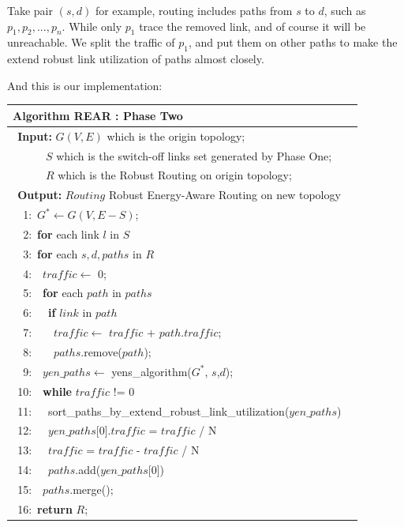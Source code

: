 \documentclass[conference]{IEEEtran}
\begin{document}
Take pair $(s, d)$ for example, routing includes paths from $s$ to $d$, such as $p_1, p_2, ... , p_n$. While only $p_1$ trace 
the removed link, and of course it will be unreachable. We split the traffic of $p_1$, and put them on other paths to make 
the extend robust link utilization of paths almost closely.


And this is our implementation:
\begin{table}[!th]
\begin{tabular}{ll}
\hline
\textbf{Algorithm REAR : Phase Two}\\
\hline
$\:\:$\textbf{Input:} $G(V,E)$ which is the origin topology;\\
$\quad\quad\ \ \ $ $S$ which is the switch-off links set generated by Phase One;\\
$\quad\quad\ \ \ $ $R$ which is the Robust Routing on origin topology;\\
$\:\:$\textbf{Output:} $Routing$ Robust Energy-Aware Routing on new topology\\
$\:\:$\ 1:\ $G^* \leftarrow G(V, E-S)$;\\
$\:\:$\ 2:\ \textbf{for} {each link $l$ in $S$}\\
$\:\:$\ 3:\quad\ \textbf{for} {each $s,d,paths$ in $R$}\\
$\:\:$\ 4:\quad\ \quad\ $traffic \leftarrow$ 0;\\
$\:\:$\ 5:\quad\ \quad\ \textbf{for} {each $path$ in $paths$}\\
$\:\:$\ 6:\quad\ \quad\ \quad\ \textbf{if} {$link$ in $path$}\\
$\:\:$\ 7:\quad\ \quad\ \quad\ \quad\ $traffic \leftarrow$ $traffic$ + $path$.$traffic$; \\
$\:\:$\ 8:\quad\ \quad\ \quad\ \quad\ $paths$.remove($path$); \\
$\:\:$\ 9:\quad\ \quad\ $yen\_paths \leftarrow$ yens\_algorithm($G^*$, $s$,$d$);\\
$\:\:$10:\quad\ \quad\ \textbf{while} {$traffic$ != 0}\\
$\:\:$11:\quad\ \quad\ \quad\ sort\_paths\_by\_extend\_robust\_link\_utilization($yen\_paths$)\\
$\:\:$12:\quad\ \quad\ \quad\ $yen\_paths$[0].$traffic$ = $traffic$ / N\\
$\:\:$13:\quad\ \quad\ \quad\ $traffic$ = $traffic$ - $traffic$ / N\\
$\:\:$14:\quad\ \quad\ \quad\ $paths$.add($yen\_paths$[0])\\
$\:\:$15:\quad\ \quad\ $paths$.merge();\\
$\:\:$16:\ \textbf{return} $R$;\\
\hline
\end{tabular}
\end{table}
\end{document}
